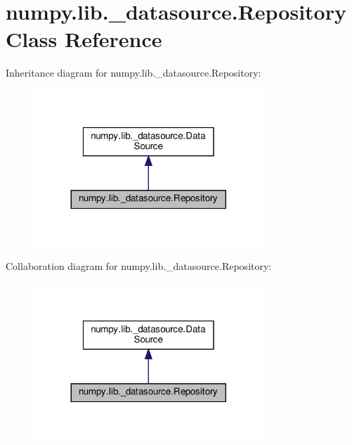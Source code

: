 \hypertarget{classnumpy_1_1lib_1_1__datasource_1_1Repository}{}\section{numpy.\+lib.\+\_\+datasource.\+Repository Class Reference}
\label{classnumpy_1_1lib_1_1__datasource_1_1Repository}


Inheritance diagram for numpy.\+lib.\+\_\+datasource.\+Repository\+:
\nopagebreak
\begin{figure}[H]
\begin{center}
\leavevmode
\includegraphics[width=245pt]{classnumpy_1_1lib_1_1__datasource_1_1Repository__inherit__graph}
\end{center}
\end{figure}


Collaboration diagram for numpy.\+lib.\+\_\+datasource.\+Repository\+:
\nopagebreak
\begin{figure}[H]
\begin{center}
\leavevmode
\includegraphics[width=245pt]{classnumpy_1_1lib_1_1__datasource_1_1Repository__coll__graph}
\end{center}
\end{figure}
